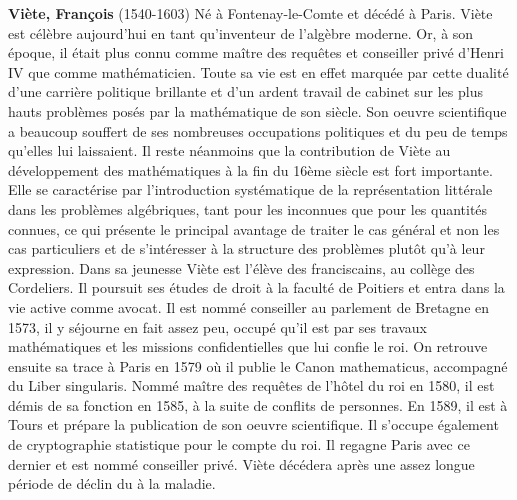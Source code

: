 \textbf{Viète, François} (1540-1603) Né à Fontenay-le-Comte et décédé à Paris. Viète est célèbre aujourd'hui en tant qu'inventeur de l'algèbre moderne. Or, à son époque, il était plus connu comme maître des requêtes et conseiller privé d'Henri IV que comme mathématicien. Toute sa vie est en effet marquée par cette dualité d'une carrière politique brillante et d'un ardent travail de cabinet sur les plus hauts problèmes posés par la mathématique de son siècle. Son oeuvre scientifique a beaucoup souffert de ses nombreuses occupations politiques et du peu de temps qu'elles lui laissaient. Il reste néanmoins que la contribution de Viète au développement des mathématiques à la fin du 16ème siècle est fort importante. Elle se caractérise par l'introduction systématique de la représentation littérale dans les problèmes algébriques, tant pour les inconnues que pour les quantités connues, ce qui présente le principal avantage de traiter le cas général et non les cas particuliers et de s'intéresser à la structure des problèmes plutôt qu'à leur expression. Dans sa jeunesse Viète est l'élève des franciscains, au collège des Cordeliers. Il poursuit ses études de droit à la faculté de Poitiers et entra dans la vie active comme avocat. Il est nommé conseiller au parlement de Bretagne en 1573, il y séjourne en fait assez peu, occupé qu'il est par ses travaux mathématiques et les missions confidentielles que lui confie le roi. On retrouve ensuite sa trace à Paris en 1579 où il publie le Canon mathematicus, accompagné du Liber singularis. Nommé maître des requêtes de l'hôtel du roi en 1580, il est démis de sa fonction en 1585, à la suite de conflits de personnes. En 1589, il est à Tours et prépare la publication de son oeuvre scientifique. Il s'occupe également de cryptographie statistique pour le compte du roi. Il regagne Paris avec ce dernier et est nommé conseiller privé. Viète décédera après une assez longue période de déclin du à la maladie.


{}
\label{sec:W}

